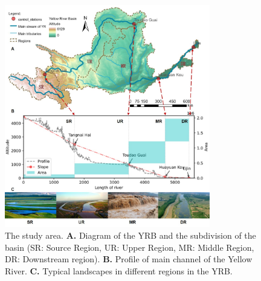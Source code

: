 \documentclass[9pt,twoside,lineno]{pnas-new}
\begin{document}

\begin{figure}
    \centering
    \includegraphics[width=0.8\textwidth]{../../figures/sup/s1_study_area.jpg}
    \caption{
        The study area.
        \textbf{A.} Diagram of the YRB and the subdivision of the basin (SR: Source Region, UR: Upper Region, MR: Middle Region, DR: Downstream region).
        \textbf{B.} Profile of main channel of the Yellow River.
        \textbf{C.} Typical landscapes in different regions in the YRB.
    }
\end{figure}
\end{document}
